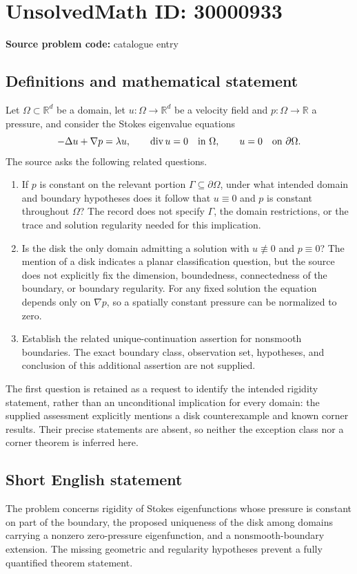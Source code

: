 \documentclass[11pt]{article}
\newcommand{\R}{\mathbb{R}}
\begin{document}
\section*{UnsolvedMath ID: 30000933}
\textbf{Source problem code:} catalogue entry
\subsection{Definitions and mathematical statement}
Let \(\Omega\subset\R^d\) be a domain, let \(u:\Omega\to\R^d\) be a velocity field and \(p:\Omega\to\R\) a pressure, and consider the Stokes eigenvalue equations
\[
-\Delta u+\nabla p=\lambda u,\qquad \operatorname{div}u=0\quad\hbox{in }\Omega,
\qquad u=0\quad\hbox{on }\partial\Omega.
\]
The source asks the following related questions.
\begin{enumerate}
\item If \(p\) is constant on the relevant portion \(\Gamma\subseteq\partial\Omega\), under what intended domain and boundary hypotheses does it follow that \(u\equiv0\) and \(p\) is constant throughout \(\Omega\)? The record does not specify \(\Gamma\), the domain restrictions, or the trace and solution regularity needed for this implication.
\item Is the disk the only domain admitting a solution with \(u\not\equiv0\) and \(p\equiv0\)? The mention of a disk indicates a planar classification question, but the source does not explicitly fix the dimension, boundedness, connectedness of the boundary, or boundary regularity. For any fixed solution the equation depends only on \(\nabla p\), so a spatially constant pressure can be normalized to zero.
\item Establish the related unique-continuation assertion for nonsmooth boundaries. The exact boundary class, observation set, hypotheses, and conclusion of this additional assertion are not supplied.
\end{enumerate}
The first question is retained as a request to identify the intended rigidity statement, rather than an unconditional implication for every domain: the supplied assessment explicitly mentions a disk counterexample and known corner results. Their precise statements are absent, so neither the exception class nor a corner theorem is inferred here.
\subsection{Short English statement}
The problem concerns rigidity of Stokes eigenfunctions whose pressure is constant on part of the boundary, the proposed uniqueness of the disk among domains carrying a nonzero zero-pressure eigenfunction, and a nonsmooth-boundary extension. The missing geometric and regularity hypotheses prevent a fully quantified theorem statement.
\end{document}
